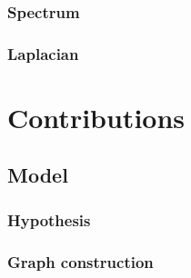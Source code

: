 \documentclass[a4paper,12pt,twoside]{report}
\begin{document}
\section{Spectrum}

\section{Laplacian}

\part{Contributions}
\label{contributions}

\chapter{Model}

\section{Hypothesis}




\section{Graph construction}
\end{document}
